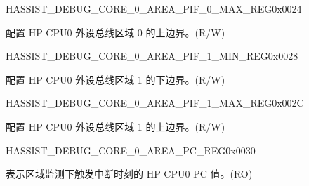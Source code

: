 \begin{register}{H}{ASSIST\_DEBUG\_CORE\_0\_AREA\_PIF\_0\_MAX\_REG}{0x0024}\label{regdesc:ASSISTDEBUGCORE0AREAPIF0MAXREG}
%
\regnewline%
\begin{regdesc}\begin{reglist}
\label{fielddesc:ASSISTDEBUGCORE0AREAPIF0MAX}\item [ASSIST\_DEBUG\_CORE\_0\_AREA\_PIF\_0\_MAX] 配置 HP CPU0 外设总线区域 0 的上边界。(R/W)
\end{reglist}\end{regdesc}
\end{register}


\begin{register}{H}{ASSIST\_DEBUG\_CORE\_0\_AREA\_PIF\_1\_MIN\_REG}{0x0028}\label{regdesc:ASSISTDEBUGCORE0AREAPIF1MINREG}
%
\regnewline%
\begin{regdesc}\begin{reglist}
\label{fielddesc:ASSISTDEBUGCORE0AREAPIF1MIN}\item [ASSIST\_DEBUG\_CORE\_0\_AREA\_PIF\_1\_MIN] 配置 HP CPU0 外设总线区域 1 的下边界。(R/W)
\end{reglist}\end{regdesc}
\end{register}


\begin{register}{H}{ASSIST\_DEBUG\_CORE\_0\_AREA\_PIF\_1\_MAX\_REG}{0x002C}\label{regdesc:ASSISTDEBUGCORE0AREAPIF1MAXREG}
%
\regnewline%
\begin{regdesc}\begin{reglist}
\label{fielddesc:ASSISTDEBUGCORE0AREAPIF1MAX}\item [ASSIST\_DEBUG\_CORE\_0\_AREA\_PIF\_1\_MAX] 配置 HP CPU0 外设总线区域 1 的上边界。(R/W)
\end{reglist}\end{regdesc}
\end{register}


\begin{register}{H}{ASSIST\_DEBUG\_CORE\_0\_AREA\_PC\_REG}{0x0030}\label{regdesc:ASSISTDEBUGCORE0AREAPCREG}
%
\regnewline%
\begin{regdesc}\begin{reglist}
\label{fielddesc:ASSISTDEBUGCORE0AREAPC}\item [ASSIST\_DEBUG\_CORE\_0\_AREA\_PC] 表示区域监测下触发中断时刻的 HP CPU0 PC 值。(RO)
\end{reglist}\end{regdesc}
\end{register}


